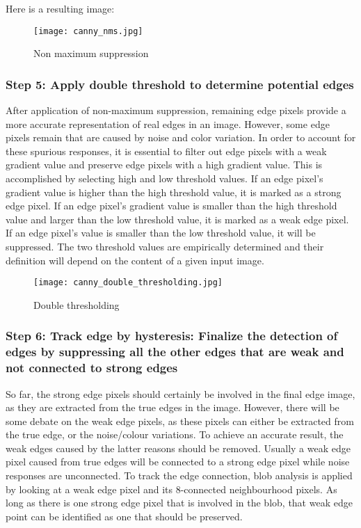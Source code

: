 \vspace{5mm}
\noindent Here is a resulting image:
\begin{figure}[!htb]
    \centering
    \texttt{[image: canny\_nms.jpg]}
    \caption{Non maximum suppression}
\end{figure}


\subsubsection{Step 5: Apply double threshold to determine potential edges}
After application of non-maximum suppression, remaining edge pixels provide a more accurate representation of real edges in an image. However, some edge pixels remain that are caused by noise and color variation. In order to account for these spurious responses, it is essential to filter out edge pixels with a weak gradient value and preserve edge pixels with a high gradient value. This is accomplished by selecting high and low threshold values. If an edge pixel’s gradient value is higher than the high threshold value, it is marked as a strong edge pixel. If an edge pixel’s gradient value is smaller than the high threshold value and larger than the low threshold value, it is marked as a weak edge pixel. If an edge pixel's value is smaller than the low threshold value, it will be suppressed. The two threshold values are empirically determined and their definition will depend on the content of a given input image.

\begin{figure}[!htb]
    \centering
    \texttt{[image: canny\_double\_thresholding.jpg]}
    \caption{Double thresholding}
\end{figure}


\subsubsection{Step 6: Track edge by hysteresis: Finalize the detection of edges by suppressing all the other edges that are weak and not connected to strong edges}
So far, the strong edge pixels should certainly be involved in the final edge image, as they are extracted from the true edges in the image. However, there will be some debate on the weak edge pixels, as these pixels can either be extracted from the true edge, or the noise/colour variations. To achieve an accurate result, the weak edges caused by the latter reasons should be removed. Usually a weak edge pixel caused from true edges will be connected to a strong edge pixel while noise responses are unconnected. To track the edge connection, blob analysis is applied by looking at a weak edge pixel and its 8-connected neighbourhood pixels. As long as there is one strong edge pixel that is involved in the blob, that weak edge point can be identified as one that should be preserved.

